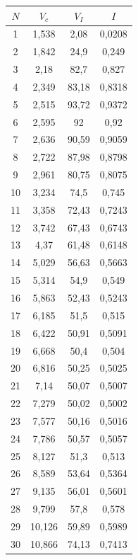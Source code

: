 \documentclass[12pt]{article}
\begin{document}
      \begin{figure}[h!]
        \begin{minipage}[h]{0.49\linewidth}

          \begin{tabular}{ | c | c | c | c | }
            \hline
            $N$ & $V_c$ & $V_I$ & $I$ \\ \hline
            1 & 1,538 & 2,08 & 0,0208 \\
            2 & 1,842 & 24,9 & 0,249 \\
            3 & 2,18 & 82,7 & 0,827 \\
            4 & 2,349 & 83,18 & 0,8318 \\
            5 & 2,515 & 93,72 & 0,9372 \\
            6 & 2,595 & 92 & 0,92 \\
            7 & 2,636 & 90,59 & 0,9059 \\
            8 & 2,722 & 87,98 & 0,8798 \\
            9 & 2,961 & 80,75 & 0,8075 \\
            10 & 3,234 & 74,5 & 0,745 \\
            11 & 3,358 & 72,43 & 0,7243 \\
            12 & 3,742 & 67,43 & 0,6743 \\
            13 & 4,37 & 61,48 & 0,6148 \\
            14 & 5,029 & 56,63 & 0,5663 \\
            15 & 5,314 & 54,9 & 0,549 \\
            16 & 5,863 & 52,43 & 0,5243 \\
            17 & 6,185 & 51,5 & 0,515 \\
            18 & 6,422 & 50,91 & 0,5091 \\
            19 & 6,668 & 50,4 & 0,504 \\
            20 & 6,816 & 50,25 & 0,5025 \\
            21 & 7,14 & 50,07 & 0,5007 \\
            22 & 7,279 & 50,02 & 0,5002 \\
            23 & 7,577 & 50,16 & 0,5016 \\
            24 & 7,786 & 50,57 & 0,5057 \\
            25 & 8,127 & 51,3 & 0,513 \\
            26 & 8,589 & 53,64 & 0,5364 \\
            27 & 9,135 & 56,01 & 0,5601 \\
            28 & 9,799 & 57,8 & 0,578 \\
            29 & 10,126 & 59,89 & 0,5989 \\
            30 & 10,866 & 74,13 & 0,7413 \\
            \hline
          \end{tabular}


\end{minipage}
\end{figure}
\end{document}
